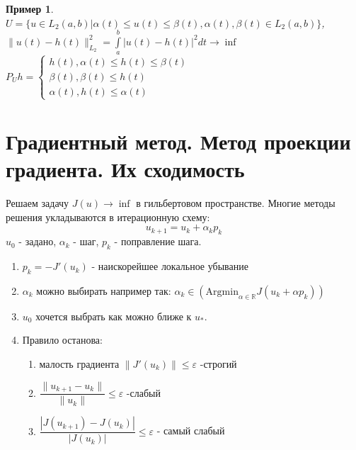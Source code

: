 \documentclass[9pt, a4paper]{extarticle}
\newtheorem*{sample}{Пример}
\begin{document}
	\begin{sample}
		$U = \{u \in L_2(a,b) \vert \alpha(t) \leq u(t) \leq \beta(t), \alpha(t), \beta(t) \in L_2(a,b)\}$,  $\|u(t) - h(t)\|_{L_2}^2 = \int\limits_a^b |u(t) - h(t)|^2 dt \to \inf$ \newline
		$P_Uh = \begin{cases}
			h(t), \alpha(t) \leq h(t) \leq \beta(t) \\
			\beta(t), \beta(t) \leq h(t) \\
			\alpha(t), h(t) \leq \alpha(t)
		\end{cases}$
	\end{sample}
	
\section{Градиентный метод. Метод проекции градиента. Их сходимость}
	Решаем задачу $J(u) \to \inf$ в гильбертовом пространстве. Многие методы решения укладываются в итерационную схему:
	\begin{equation}
		u_{k+1} = u_k + \alpha_k p_k
	\end{equation}
	$u_0$ - задано, $\alpha_k$ - шаг, $p_k$ - поправление шага. 
	\begin{enumerate}
		\item $p_k = -J'(u_k)$ - наискорейшее локальное убывание 
		\item $\alpha_k$ можно выбирать например так: $\alpha_k \in (\text{Argmin}_{\alpha \in \mathbb{R}} J(u_k + \alpha p_k))$
		\item $u_0$ хочется выбрать как можно ближе к $u_*$. 
		\item Правило останова: \begin{enumerate}
			\item малость градиента $\|J'(u_k)\| \leq \varepsilon$ -строгий
			\item $\dfrac{\|u_{k+1} -u_k \|}{\|u_k\|} \leq \varepsilon$ -слабый
			\item $\dfrac{|J(u_{k+1}) - J(u_k)|}{|J(u_k)|}\leq \varepsilon$ - самый слабый
		\end{enumerate}
	\end{enumerate}
\end{document}
